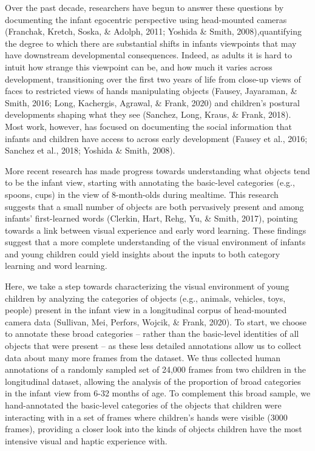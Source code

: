 \documentclass[10pt, letterpaper]{article}
\begin{document}
Over the past decade, researchers have begun to answer these questions
by documenting the infant egocentric perspective using head-mounted
cameras (Franchak, Kretch, Soska, \& Adolph, 2011; Yoshida \& Smith,
2008),quantifying the degree to which there are substantial shifts in
infants viewpoints that may have downstream developmental consequences.
Indeed, as adults it is hard to intuit how strange this viewpoint can
be, and how much it varies across development, transitioning over the
first two years of life from close-up views of faces to restricted views
of hands manipulating objects (Fausey, Jayaraman, \& Smith, 2016; Long,
Kachergis, Agrawal, \& Frank, 2020) and children's postural developments
shaping what they see (Sanchez, Long, Kraus, \& Frank, 2018). Most work,
however, has focused on documenting the social information that infants
and children have access to across early development (Fausey et al.,
2016; Sanchez et al., 2018; Yoshida \& Smith, 2008).

More recent research has made progress towards understanding what
objects tend to be the infant view, starting with annotating the
basic-level categories (e.g., spoons, cups) in the view of 8-month-olds
during mealtime. This research suggests that a small number of objects
are both pervasively present and among infants' first-learned words
(Clerkin, Hart, Rehg, Yu, \& Smith, 2017), pointing towards a link
between visual experience and early word learning. These findings
suggest that a more complete understanding of the visual environment of
infants and young children could yield insights about the inputs to both
category learning and word learning.

Here, we take a step towards characterizing the visual environment of
young children by analyzing the categories of objects (e.g., animals,
vehicles, toys, people) present in the infant view in a longitudinal
corpus of head-mounted camera data (Sullivan, Mei, Perfors, Wojcik, \&
Frank, 2020). To start, we choose to annotate these broad categories --
rather than the basic-level identities of all objects that were present
-- as these less detailed annotations allow us to collect data about
many more frames from the dataset. We thus collected human annotations
of a randomly sampled set of 24,000 frames from two children in the
longitudinal dataset, allowing the analysis of the proportion of broad
categories in the infant view from 6-32 months of age. To complement
this broad sample, we hand-annotated the basic-level categories of the
objects that children were interacting with in a set of frames where
children's hands were visible (3000 frames), providing a closer look
into the kinds of objects children have the most intensive visual and
haptic experience with.
\end{document}
